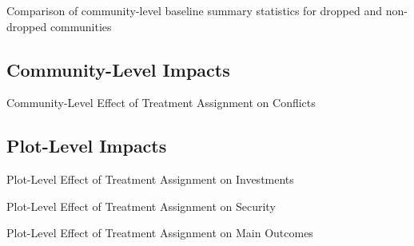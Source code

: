 \documentclass[10pt]{article}
\begin{document}
\begin{table}[H]
\caption{Comparison of community-level baseline summary statistics for dropped and non-dropped communities}
\label{summary_table_dropped}
\begin{center}
\begin{adjustbox}{max width = \textwidth}

\end{adjustbox}
\end{center}
\end{table}

\clearpage

\subsection{Community-Level Impacts}

\begin{table}[H]
\caption{Community-Level Effect of Treatment Assignment on Conflicts}
\begin{center}
\begin{adjustbox}{max width = \textwidth}

\end{adjustbox}
\end{center}
\end{table}


\clearpage
\subsection{Plot-Level Impacts}


\begin{table}[H]
\caption{Plot-Level Effect of Treatment Assignment on Investments}
\begin{center}
\begin{adjustbox}{max width = \textwidth}

\end{adjustbox}
\end{center}
\end{table}


\begin{table}[H]
\caption{Plot-Level Effect of Treatment Assignment on Security}
\begin{center}
\begin{adjustbox}{max width = \textwidth}

\end{adjustbox}
\end{center}
\end{table}

\begin{table}[H]
\caption{Plot-Level Effect of Treatment Assignment on Main Outcomes}
\begin{center}
\begin{adjustbox}{max width = \textwidth}

\end{adjustbox}
\end{center}
\end{table}
\end{document}
